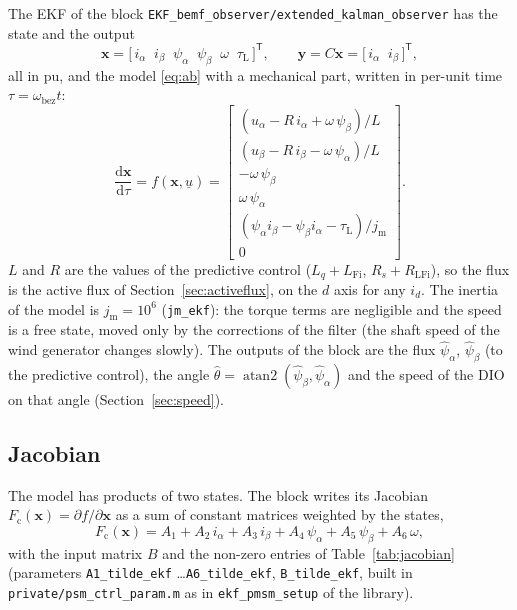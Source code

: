 \documentclass[11pt,a4paper]{scrartcl}
\newcommand{\ped}[1]{_{\mathrm{#1}}}
\newcommand{\code}[1]{\texttt{#1}}
\newcommand{\T}{^{\mathsf{T}}}
\begin{document}
\begin{onehalfspace}
The EKF of the block \code{EKF\_bemf\_observer/extended\_kalman\_observer} \cite{bolognani2003,simon2006} has the state and the output
\begin{equation}
	\bm{x} = \big[\, i_\alpha \;\; i_\beta \;\; \psi_\alpha \;\; \psi_\beta \;\; \omega \;\; \tau\ped{L} \,\big]\T, \qquad
	\bm{y} = C\bm{x} = \big[\, i_\alpha \;\; i_\beta \,\big]\T ,
\end{equation}
all in pu, and the model \eqref{eq:ab} with a mechanical part, written in per-unit time $\tau = \omega\ped{bez}t$:
\begin{equation}
	\frac{\mathrm{d}\bm{x}}{\mathrm{d}\tau} = f(\bm{x}, \underline{u}) =
	\begin{bmatrix}
		(u_\alpha - R\,i_\alpha + \omega\,\psi_\beta)/L \\
		(u_\beta - R\,i_\beta - \omega\,\psi_\alpha)/L \\
		-\omega\,\psi_\beta \\
		\omega\,\psi_\alpha \\
		(\psi_\alpha i_\beta - \psi_\beta i_\alpha - \tau\ped{L})/j\ped{m} \\
		0
	\end{bmatrix} .
	\label{eq:ekfmodel}
\end{equation}
$L$ and $R$ are the values of the predictive control ($L_q + L\ped{Fi}$, $R_s + R\ped{LFi}$), so the flux is the active flux of Section~\ref{sec:activeflux}, on the $d$ axis for any $i_d$. The inertia of the model is $j\ped{m} = 10^6$ (\code{jm\_ekf}): the torque terms are negligible and the speed is a free state, moved only by the corrections of the filter (the shaft speed of the wind generator changes slowly). The outputs of the block are the flux $\hat\psi_\alpha$, $\hat\psi_\beta$ (to the predictive control), the angle $\hat\theta = \operatorname{atan2}(\hat\psi_\beta, \hat\psi_\alpha)$ and the speed of the DIO on that angle (Section~\ref{sec:speed}).

\subsection{Jacobian}

The model has products of two states. The block writes its Jacobian $F\ped{c}(\bm{x}) = \partial f/\partial\bm{x}$ as a sum of constant matrices weighted by the states,
\begin{equation}
	F\ped{c}(\bm{x}) = A_1 + A_2\,i_\alpha + A_3\,i_\beta + A_4\,\psi_\alpha + A_5\,\psi_\beta + A_6\,\omega ,
	\label{eq:jacobian}
\end{equation}
with the input matrix $B$ and the non-zero entries of Table~\ref{tab:jacobian} (parameters \code{A1\_tilde\_ekf} \ldots \code{A6\_tilde\_ekf}, \code{B\_tilde\_ekf}, built in \code{private/psm\_ctrl\_param.m} as in \code{ekf\_pmsm\_setup} of the library).


\end{onehalfspace}
\end{document}
